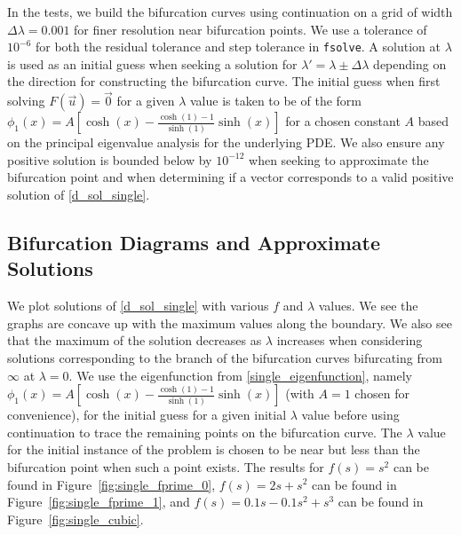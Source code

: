 \documentclass[12pt, reqno]{amsart}
\numberwithin{equation}{section}
\begin{document}
In the tests, we build the bifurcation curves using continuation on a grid of width $\Delta \lambda = 0.001$ for finer resolution near bifurcation points.  
We use a tolerance of $10^{-6}$ for both the residual tolerance and step tolerance in \texttt{fsolve}.  
A solution at $\lambda$ is used as an initial guess when seeking a solution for $\lambda' = \lambda\pm \Delta \lambda$ 
depending on the direction for constructing the bifurcation curve.  
The initial guess when first solving $F(\vec{u}) = \vec{0}$ for a given $\lambda$ value is taken to be of the form 
$\phi_1(x) = A[\cosh(x) - \frac{\cosh(1)-1}{\sinh(1)} \sinh(x)]$ for a chosen constant $A$ based on the 
principal eigenvalue analysis for the underlying PDE. 
We also ensure any positive solution is bounded below by $10^{-12}$ when seeking to approximate the bifurcation point 
and when determining if a vector corresponds to a valid positive solution of \eqref{d_sol_single}.  




\subsection{Bifurcation Diagrams and Approximate Solutions}
We plot solutions of \eqref{d_sol_single} with various $f$ and $\lambda$ values. We see the graphs are concave up with the maximum values along the boundary. We also see that the maximum of the solution decreases as $\lambda$ increases when considering solutions corresponding to the branch of the bifurcation curves bifurcating from $\infty$ at $\lambda = 0$. We use the eigenfunction from \eqref{single_eigenfunction}, namely $\phi_1(x) = A[\cosh(x) - \frac{\cosh(1)-1}{\sinh(1)} \sinh(x)]$ (with $A = 1$ chosen for convenience), for the initial guess for a given initial $\lambda$ value before using continuation to trace the remaining points on the bifurcation curve.
The $\lambda$ value for the initial instance of the problem is chosen to be near but less than the bifurcation point when such a point exists.  
The results for $f(s) = s^2$ can be found in Figure~\ref{fig:single_fprime_0}, 
$f(s) = 2s+s^2$ can be found in Figure~\ref{fig:single_fprime_1}, 
and $f(s) = 0.1s - 0.1s^2 + s^3$ can be found in Figure~\ref{fig:single_cubic}. 


\end{document}
